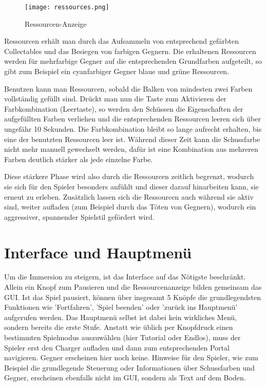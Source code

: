 \begin{figure}[H]
\centering
\texttt{[image: ressources.png]}
\caption{Ressourcen-Anzeige}
\label{img:ress}
\end{figure}

Ressourcen erhält man durch das Aufsammeln von entsprechend gefärbten Collectables und das Besiegen von farbigen Gegnern. Die erhaltenen Ressourcen werden für mehrfarbige Gegner auf die entsprechenden Grundfarben aufgeteilt, so gibt zum Beispiel ein cyanfarbiger Gegner blaue und grüne Ressourcen.

Benutzen kann man Ressourcen, sobald die Balken von mindesten zwei Farben vollständig gefüllt sind. Drückt man nun die Taste zum Aktivieren der Farbkombination (Leertaste), so werden den Schüssen die Eigenschaften der aufgefüllten Farben verliehen und die entsprechenden Ressourcen leeren sich über ungefähr 10 Sekunden. Die Farbkombination bleibt so lange aufrecht erhalten, bis eine der benutzten Ressourcen leer ist. Während dieser Zeit kann die Schussfarbe nicht mehr manuell gewechselt werden, dafür ist eine Kombination aus mehreren Farben deutlich stärker als jede einzelne Farbe.

Diese stärkere Phase wird also durch die Ressourcen zeitlich begrenzt, wodurch sie sich für den Spieler besonders anfühlt und dieser darauf hinarbeiten kann, sie erneut zu erleben. Zusätzlich lassen sich die Ressourcen auch während sie aktiv sind, weiter aufladen (zum Beispiel durch das Töten von Gegnern), wodurch ein aggressiver, spannender Spielstil gefördert wird.



\section{Interface und Hauptmenü}

Um die Immersion zu steigern, ist das Interface auf das Nötigste beschränkt. Allein ein Knopf zum Pausieren und die Ressourcenanzeige bilden gemeinsam das GUI. Ist das Spiel pausiert, können über insgesamt 5 Knöpfe die grundlegendsten Funktionen wie 'Fortfahren', 'Spiel beenden' oder 'zurück ins Hauptmenü' aufgerufen werden. 
Das Hauptmenü selbst ist dabei kein wirkliches Menü, sondern bereits die erste Stufe. Anstatt wie üblich per Knopfdruck einen bestimmten Spielmodus auszuwählen (hier Tutorial oder Endlos), muss der Spieler erst den Charger aufladen und dann zum entsprechenden Portal navigieren. Gegner erscheinen hier noch keine. Hinweise für den Spieler, wie zum Beispiel die grundlegende Steuerung oder Informationen über Schussfarben und Gegner, erscheinen ebenfalls nicht im GUI, sondern als Text auf dem Boden. 

